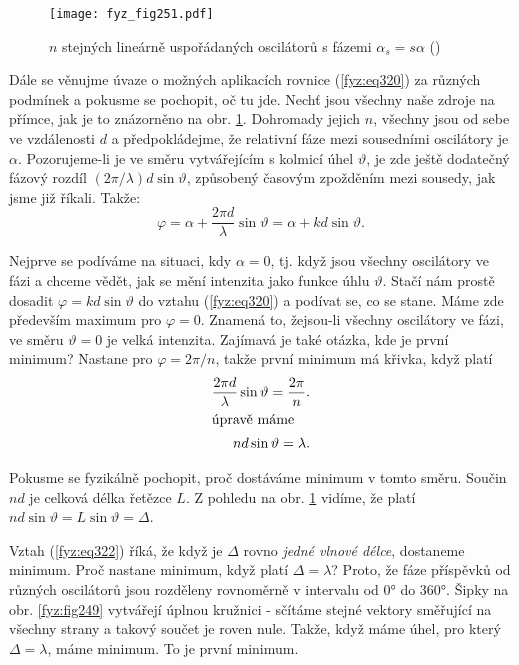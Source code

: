 {    \begin{figure}[ht!] %
      \centering
      \texttt{[image: fyz\_fig251.pdf]}
      \caption{\(n\) stejných lineárně uspořádaných oscilátorů s fázemi \(\alpha_s = s\alpha\)
               (\cite[s.~394]{Feynman01})}
      \label{fyz:fig251}
    \end{figure}

    Dále se věnujme úvaze o možných aplikacích rovnice (\ref{fyz:eq320}) za různých podmínek a 
    pokusme se pochopit, oč tu jde. Nechť jsou všechny naše zdroje na přímce, jak je to znázorněno 
    na obr. \ref{fyz:fig251}. Dohromady jejich \(n\), všechny jsou od sebe ve vzdálenosti \(d\) a 
    předpokládejme, že relativní fáze mezi sousedními oscilátory je \(\alpha\). Pozorujeme-li je ve 
    směru vytvářejícím s kolmicí úhel \(\vartheta\), je zde ještě dodatečný fázový rozdíl 
    \((2\pi/\lambda)d\sin\vartheta\), způsobený časovým zpožděním mezi sousedy, jak jsme již 
    říkali. Takže:
    \begin{equation}\label{fyz:eq321}
      \varphi = \alpha + \frac{2\pi d}{\lambda}\sin\vartheta = \alpha + kd\sin\vartheta.
    \end{equation}
    
    Nejprve se podíváme na situaci, kdy \(\alpha = 0\), tj. když jsou všechny oscilátory ve fázi a 
    chceme vědět, jak se mění intenzita jako funkce úhlu \(\vartheta\). Stačí nám prostě dosadit 
    \(\varphi = kd\sin\vartheta\) do vztahu (\ref{fyz:eq320}) a podívat se, co se stane. Máme zde 
    především maximum pro \(\varphi=0\). Znamená to, žejsou-li všechny oscilátory ve fázi, ve směru 
    \(\vartheta = 0\) je velká intenzita. Zajímavá je také otázka, kde je první minimum? Nastane 
    pro \(\varphi = 2\pi/n\), takže první minimum má křivka, když platí 
    \begin{align}
      \frac{2\pi d}{\lambda}\sin\vartheta = \frac{2\pi}{n}. \nonumber \\
      \shortintertext{úpravě máme}  
      nd\sin\vartheta = \lambda.                            \label{fyz:eq322}
    \end{align}

    Pokusme se fyzikálně pochopit, proč dostáváme minimum v tomto směru. Součin \(nd\) je celková 
    délka řetězce \(L\). Z pohledu na obr. \ref{fyz:fig251} vidíme, že platí \(nd\sin\vartheta = L 
    \sin\vartheta = \Delta\).
    
    Vztah (\ref{fyz:eq322}) říká, že když je \(\Delta\) rovno \emph{jedné vlnové délce}, dostaneme 
    minimum. Proč nastane minimum, když platí \(\Delta = \lambda\)? Proto, že fáze příspěvků od 
    různých oscilátorů jsou rozděleny rovnoměrně v intervalu od \ang{0} do \ang{360}. Šipky na obr. 
    \ref{fyz:fig249} vytvářejí úplnou kružnici - sčítáme stejné vektory směřující na všechny strany 
    a takový součet je roven nule. Takže, když máme úhel, pro který \(\Delta = \lambda\), máme 
    minimum. To je první minimum.
    
}
